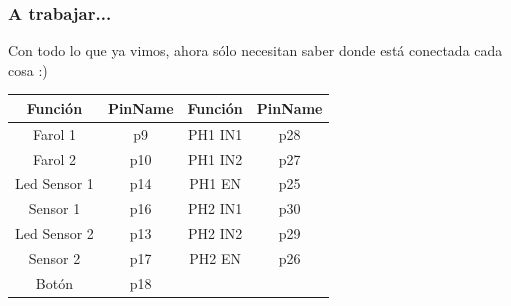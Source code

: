 \documentclass[compress]{beamer}
\begin{document}
\begin{frame}
\frametitle{A trabajar...}
Con todo lo que ya vimos, ahora sólo necesitan saber donde está conectada cada cosa :)
\begin{center}
\begin{tabular}{|c|c|c|c|}
\hline
\textbf{Función} & \textbf{PinName} & \textbf{Función} & \textbf{PinName}\\\hline
Farol 1 & p9 & PH1 IN1 & p28\\\hline
Farol 2 & p10 & PH1 IN2 & p27\\\hline
Led Sensor 1 & p14 & PH1 EN & p25\\\hline
Sensor 1 & p16 & PH2 IN1 & p30\\\hline
Led Sensor 2 & p13 & PH2 IN2 & p29\\\hline
Sensor 2 & p17 & PH2 EN & p26\\\hline
Botón & p18 & & \\\hline
\end{tabular}
\end{center}
\end{frame}
\end{document}
